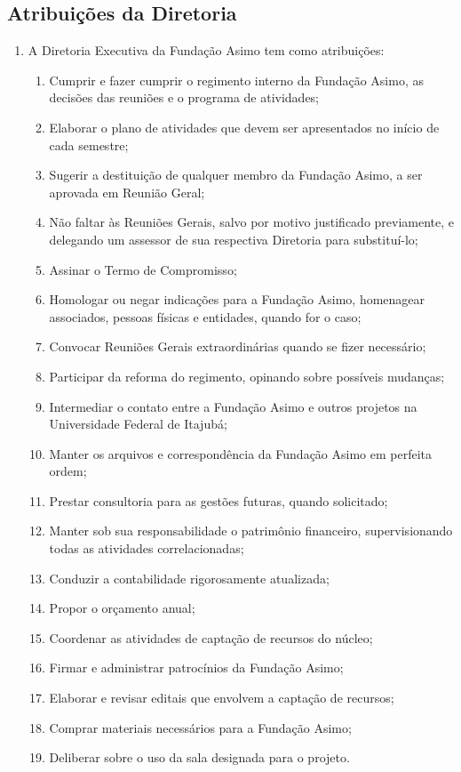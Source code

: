     \subsection{Atribuições da Diretoria}
    \begin{enumerate}
        \item A Diretoria Executiva da Fundação Asimo tem como atribuições:
         \begin{enumerate}
            \item Cumprir e fazer cumprir o regimento interno da Fundação Asimo, as decisões das reuniões e o programa de atividades;
            \item Elaborar o plano de atividades que devem ser apresentados no início de cada semestre;
            \item Sugerir a destituição de qualquer membro da Fundação Asimo, a ser aprovada em Reunião Geral;
            \item Não faltar às Reuniões Gerais, salvo por motivo justificado previamente, e delegando um assessor de sua respectiva Diretoria para substituí-lo;
            \item Assinar o Termo de Compromisso;
            \item Homologar ou negar indicações para a Fundação Asimo, homenagear associados, pessoas físicas e entidades, quando for o caso;
            
            \item Convocar Reuniões Gerais extraordinárias quando se fizer necessário;
            \item Participar da reforma do regimento, opinando sobre possíveis mudanças;
            \item Intermediar o contato entre a Fundação Asimo e outros projetos na Universidade Federal de Itajubá;
            \item Manter os arquivos e correspondência da Fundação Asimo em perfeita ordem;
            \item Prestar consultoria para as gestões futuras, quando solicitado;
            \item Manter sob sua responsabilidade o patrimônio financeiro, supervisionando todas as atividades correlacionadas;
            \item Conduzir a contabilidade rigorosamente atualizada;
            \item Propor o orçamento anual;
            \item Coordenar as atividades de captação de recursos do núcleo;
            \item Firmar e administrar patrocínios da Fundação Asimo;
            \item Elaborar e revisar editais que envolvem a captação de recursos;
            \item Comprar materiais necessários para a Fundação Asimo;
            \item Deliberar sobre o uso da sala designada para o projeto.
        \end{enumerate}
    \end{enumerate}
